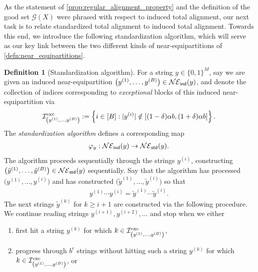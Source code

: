 \documentclass[11pt]{amsart}
\numberwithin{equation}{section}
\numberwithin{equation}{section}
\newcommand{\1}{\mathbbm{1}}
\newcommand{\ind}{\textup{\textsf{ind}}}
\newcommand{\std}{\textup{\textsf{std}}}
\newcommand{\exc}{\textup{exc}}
\theoremstyle{definition}
\newtheorem{definition}[theorem]{Definition}
\begin{document}
As the statement of \cref{prop:regular_alignment_property} and the definition of the good set $\mathcal G(X)$ were phrased with respect to induced total alignment, our next task is to relate standardized total alignment to induced total alignment. Towards this end, we introduce the following standardization algorithm, which will serve as our key link between the two different kinds of near-equipartitions of \cref{defn:near_equipartitions}.

\begin{definition}[Standardization algorithm] \label{defn:standardization_algorithm}
    For a string $y \in \{0,1\}^M$, say we are given an induced near-equipartition $\big(y^{(1)}, \dots, y^{(B)}\big) \in \mathcal{NE}_\ind(y)$, and denote the collection of indices corresponding to \textit{exceptional} blocks of this induced near-equipartition via
    \begin{align*}
        \mathcal I_{\left(y^{(1)}, \dots, y^{(B)}\right)}^\exc := \left\{ i \in [B] : |y^{(i)}| \notin \left[ (1-\delta)\alpha b, (1+\delta)\alpha b \right] \right\}.
    \end{align*}
    The \emph{standardization algorithm} defines a corresponding map
    \begin{align} \label{eq:standardization_algo_map}
        \varphi_{y}: \mathcal{NE}_\ind(y) \to \mathcal{NE}_\std(y).
    \end{align}
    The algorithm proceeds sequentially through the strings $y^{(i)}$, constructing $\big(\tilde{y}^{(1)}, \dots, \tilde{y}^{(B)}\big) \in \mathcal{NE}_\std(y)$ sequentially. Say that the algorithm has processed $\big(y^{(1)}, \dots, y^{(i)}\big)$ and has constructed $\big(\tilde{y}^{(1)}, \dots, \tilde{y}^{(i)}\big)$ so that
    \begin{align} \label{eq:standarziation_algo_key_cond}
        y^{(1)} \cdots y^{(i)} = \tilde{y}^{(1)} \cdots \tilde{y}^{(i)}.
    \end{align}
    The next strings $\tilde{y}^{(k)}$ for $k \geq i+1$ are constructed via the following procedure. We continue reading strings $y^{(i+1)}, y^{(i+2)}, \dots$ and stop when we either
    \begin{enumerate}
        \item[(a)] first hit a string $y^{(k)}$ for which $k \in \mathcal I_{\left(y^{(1)}, \dots, y^{(B)}\right)}^\exc$,

        \item[(b)] progress through $b^\epsilon$ strings without hitting such a string $y^{(k)}$ for which $k \in \mathcal I_{\left(y^{(1)}, \dots, y^{(B)}\right)}^\exc$, or


\end{enumerate}
\end{definition}
\end{document}
